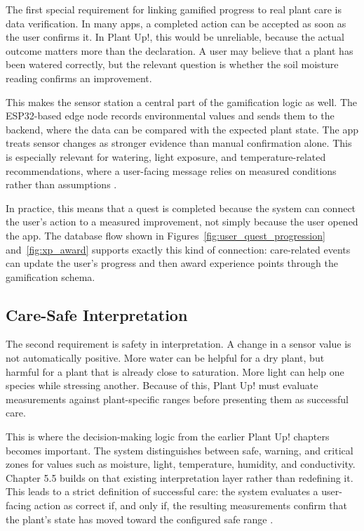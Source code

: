 The first special requirement for linking gamified progress to real plant care is data verification. In many apps, a completed action can be accepted as soon as the user confirms it. In Plant Up!, this would be unreliable, because the actual outcome matters more than the declaration. A user may believe that a plant has been watered correctly, but the relevant question is whether the soil moisture reading confirms an improvement.

This makes the sensor station a central part of the gamification logic as well. The ESP32-based edge node records environmental values and sends them to the backend, where the data can be compared with the expected plant state. The app treats sensor changes as stronger evidence than manual confirmation alone. This is especially relevant for watering, light exposure, and temperature-related recommendations, where a user-facing message relies on measured conditions rather than assumptions \cite{boniecki2023smartSensors,plantUpProject}.

In practice, this means that a quest is completed because the system can connect the user's action to a measured improvement, not simply because the user opened the app. The database flow shown in Figures~\ref{fig:user_quest_progression} and~\ref{fig:xp_award} supports exactly this kind of connection: care-related events can update the user's progress and then award experience points through the gamification schema.

\subsection{Care-Safe Interpretation}

The second requirement is safety in interpretation. A change in a sensor value is not automatically positive. More water can be helpful for a dry plant, but harmful for a plant that is already close to saturation. More light can help one species while stressing another. Because of this, Plant Up! must evaluate measurements against plant-specific ranges before presenting them as successful care.

This is where the decision-making logic from the earlier Plant Up! chapters becomes important. The system distinguishes between safe, warning, and critical zones for values such as moisture, light, temperature, humidity, and conductivity. Chapter 5.5 builds on that existing interpretation layer rather than redefining it. This leads to a strict definition of successful care: the system evaluates a user-facing action as correct if, and only if, the resulting measurements confirm that the plant's state has moved toward the configured safe range \cite{dssPlantProtection,boniecki2023smartSensors}.

